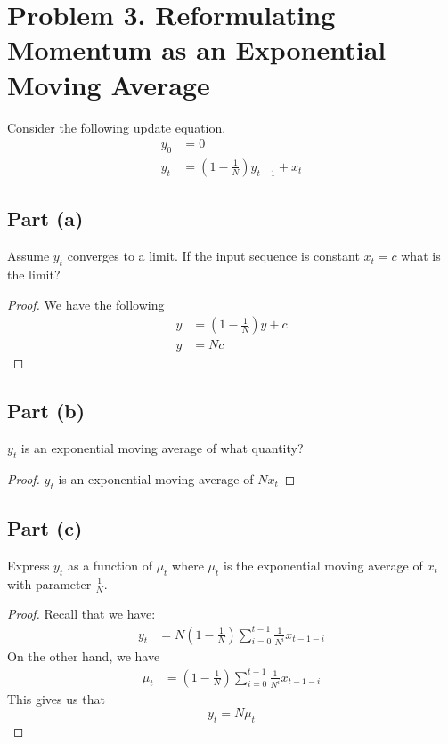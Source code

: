 \documentclass{amsart}
\theoremstyle{definition}
\begin{document}
\section*{Problem 3. Reformulating Momentum as an Exponential Moving Average}
Consider the following update equation.
\begin{align*}
    y_0 &= 0 \\
    y_t &= \left(1 - \frac1{N}\right)y_{t - 1} + x_t
\end{align*}
\subsection*{Part (a)}
Assume $y_t$ converges to a limit. If the input sequence is constant $x_t = c$ what is the limit?
\begin{proof}
    We have the following
    \begin{align*}
        y &= \left(1 - \frac1{N}\right) y + c \\
        y &= N c
    \end{align*}
\end{proof}

\subsection*{Part (b)} $y_t$ is an exponential moving average of what quantity?

\begin{proof}
$y_t$ is an exponential moving average of $N x_t$   
\end{proof}

\subsection*{Part (c)} Express $y_t$ as a function of $\mu_t$ where $\mu_t$ is the exponential moving average of $x_t$ with parameter $\frac1{N}$. 

\begin{proof}
    Recall that we have:
    \begin{align*}
        y_t &= N\left(1 - \frac1{N}\right) \sum_{i = 0}^{t - 1} \frac1{N^i}  x_{t - 1 - i} 
    \end{align*}
    On the other hand, we have
    \begin{align*}
        \mu_t &= \left(1 - \frac1{N}\right) \sum_{i = 0}^{t - 1} \frac1{N^i} x_{t - 1 - i} 
    \end{align*}
    This gives us that 
    \[
    y_t = N \mu_t
    \]
\end{proof}
\end{document}
